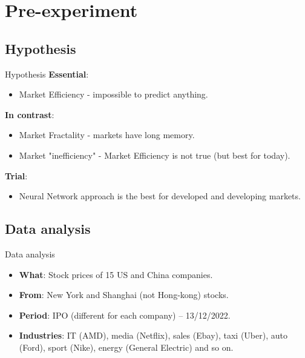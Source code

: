 \documentclass[11pt, aspectratio= 169]{beamer}
\begin{document}
	\section{Pre-experiment}
	\subsection{Hypothesis}
	\begin{frame}{Hypothesis}
		\Large
		\textbf{Essential}:
		\begin{itemize}
			\item Market Efficiency \cite{fama1970efficient} - impossible to predict anything.
		\end{itemize}
		
		\textbf{In contrast}:
		\begin{itemize}
			\item Market Fractality \cite{mandelbrot2006misbehavior} - markets have long memory.
			\item Market "inefficiency" \cite{matrin2011history} - Market Efficiency is not true (but best for today).
		\end{itemize}
	
		\textbf{Trial}:
		\begin{itemize}
			\item Neural Network approach is the best for developed and developing markets. 
		\end{itemize}
	\end{frame}
	
	\subsection{Data analysis}
	\begin{frame}{Data analysis}
		\Large
		\begin{itemize}
			\item[] \textbf{What}: Stock prices of 15 US and China companies.
			\item[] \textbf{From}: New York and Shanghai (not Hong-kong) stocks.
			\item[] \textbf{Period}: IPO (different for each company) -- 13/12/2022.
			\item[] \textbf{Industries}: IT (AMD), media (Netflix), sales (Ebay), taxi (Uber), auto (Ford), sport (Nike), energy (General Electric) and so on.
		\end{itemize}
	\end{frame}
\end{document}
